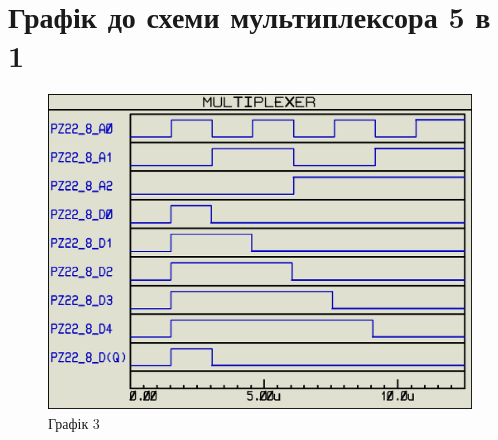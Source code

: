 \documentclass{article}
\begin{document}
\begin{normalsize}
\begin{figure}[H]
		\hspace{5px}
	\end{figure}

	\section*{Графік до схеми мультиплексора 5 в 1}
	\begin{figure}[H]
		\centering
		\includegraphics[scale=0.34]{g3}	
		\caption{Графік 3}
	\end{figure}


\end{normalsize}
\end{document}
